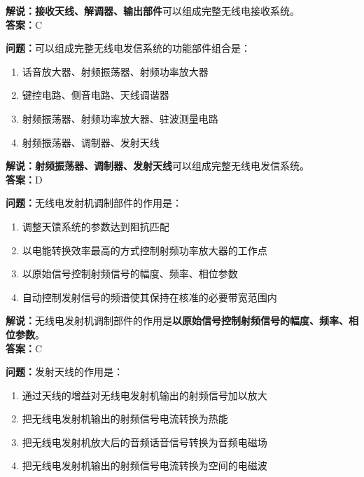 \documentclass{ctexbook}
\begin{document}
\noindent\textbf{解说：}\textbf{接收天线、解调器、输出部件}可以组成完整无线电接收系统。\\\noindent\textbf{答案：}C%


\bigskip


\noindent\textbf{问题：}可以组成完整无线电发信系统的功能部件组合是：

\begin{enumerate}[label=\Alph*), leftmargin=3em]
	\item 话音放大器、射频振荡器、射频功率放大器
	\item 键控电路、侧音电路、天线调谐器
	\item 射频振荡器、射频功率放大器、驻波测量电路
	\item 射频振荡器、调制器、发射天线
\end{enumerate}

\noindent\textbf{解说：}\textbf{射频振荡器、调制器、发射天线}可以组成完整无线电发信系统。\\\noindent\textbf{答案：}D%


\bigskip


\noindent\textbf{问题：}无线电发射机调制部件的作用是：

\begin{enumerate}[label=\Alph*), leftmargin=3em]
	\item 调整天馈系统的参数达到阻抗匹配
	\item 以电能转换效率最高的方式控制射频功率放大器的工作点
	\item 以原始信号控制射频信号的幅度、频率、相位参数
	\item 自动控制发射信号的频谱使其保持在核准的必要带宽范围内
\end{enumerate}

\noindent\textbf{解说：}无线电发射机调制部件的作用是\textbf{以原始信号控制射频信号的幅度、频率、相位参数}。\\\noindent\textbf{答案：}C%


\bigskip


\noindent\textbf{问题：}发射天线的作用是：

\begin{enumerate}[label=\Alph*), leftmargin=3em]
	\item 通过天线的增益对无线电发射机输出的射频信号加以放大
	\item 把无线电发射机输出的射频信号电流转换为热能
	\item 把无线电发射机放大后的音频话音信号转换为音频电磁场
	\item 把无线电发射机输出的射频信号电流转换为空间的电磁波
\end{enumerate}
\end{document}
